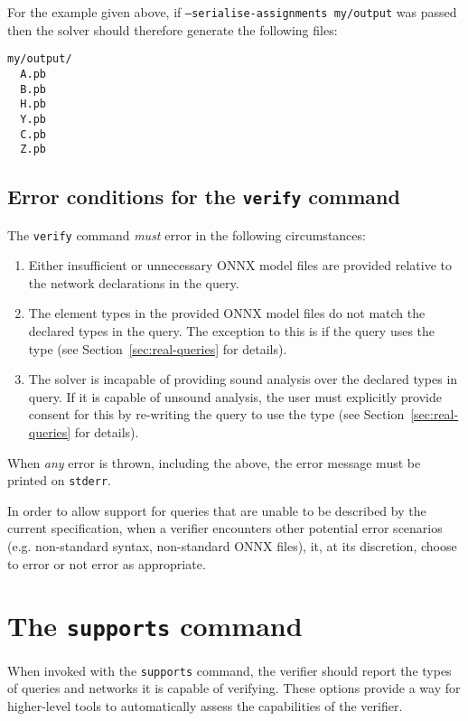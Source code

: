 For the example given above, if \texttt{--serialise-assignments my/output} was passed then the solver should therefore generate the following files:
\begin{lstlisting}[style=bash]
my/output/
  A.pb
  B.pb
  H.pb
  Y.pb
  C.pb
  Z.pb
\end{lstlisting}

\subsection{Error conditions for the \texttt{verify} command}

The \texttt{verify} command \textit{must} error in the following circumstances:
\begin{enumerate}
\item Either insufficient or unnecessary ONNX model files are provided relative to the network declarations in the \vnnlib{} query.
\item The element types in the provided ONNX model files do not match the declared types in the \vnnlib{} query. The exception to this is if the query uses the  type (see Section~\ref{sec:real-queries} for details).
\item The solver is incapable of providing sound analysis over the declared types in \vnnlib{} query. If it is capable of unsound analysis, the user must explicitly provide consent for this by re-writing the query to use the  type (see Section~\ref{sec:real-queries} for details).
\end{enumerate}
When \textit{any} error is thrown, including the above, the error message must be printed on \texttt{stderr}.

In order to allow support for queries that are unable to be described by the current \vnnlib{} specification, when a verifier encounters other potential error scenarios (e.g. non-standard \vnnlib{} syntax, non-standard ONNX files), it, at its discretion, choose to error or not error as appropriate.

\section{The \texttt{supports} command}
\label{sec:global_capabilities}

When invoked with the \texttt{supports} command, the verifier should report the types of queries and networks it is capable of verifying.
These options provide a way for higher-level tools to automatically assess the capabilities of the verifier.

